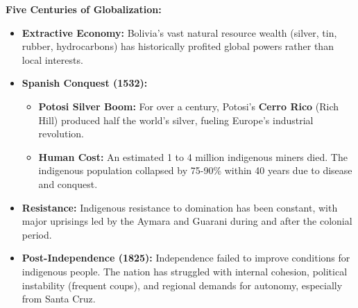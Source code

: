 \documentclass{article}
\begin{document}
    \noindent \textbf{Five Centuries of Globalization:}
    \begin{itemize}
        \item \textbf{Extractive Economy:} Bolivia's vast natural resource
        wealth (silver, tin, rubber, hydrocarbons) has historically profited
        global powers rather than local interests.
        \item \textbf{Spanish Conquest (1532):}
        \begin{itemize}
            \item \textbf{Potosi Silver Boom:} For over a century, Potosi's \textbf{Cerro Rico} (Rich Hill) produced half the world's silver, fueling Europe's industrial revolution.
            \item \textbf{Human Cost:} An estimated 1 to 4 million
            indigenous miners died. The indigenous population collapsed by
            75-90\% within 40 years due to disease and conquest.
        \end{itemize}
        \item \textbf{Resistance:} Indigenous resistance to domination has
        been constant, with major uprisings led by the Aymara and Guarani
        during and after the colonial period.
        \item \textbf{Post-Independence (1825):} Independence failed to
        improve conditions for indigenous people. The nation has struggled
        with internal cohesion, political instability (frequent coups), and
        regional demands for autonomy, especially from Santa Cruz.
    \end{itemize}
\end{document}

